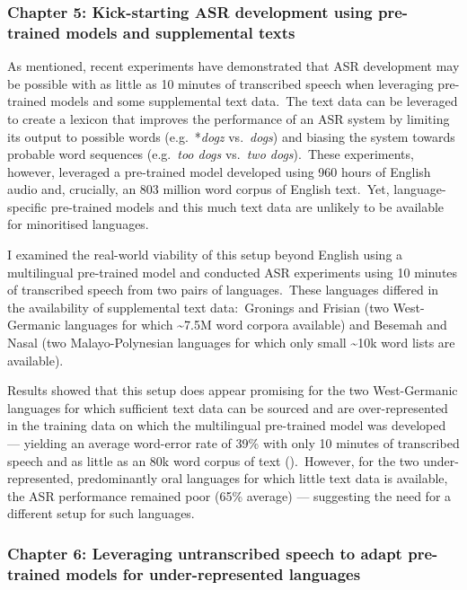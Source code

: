 \documentclass[main.tex]{subfiles}
\begin{document}
\subsubsection{Chapter 5: Kick-starting ASR development using pre-trained models and supplemental texts}

As mentioned, recent experiments have demonstrated that ASR development may be possible with as little as 10 minutes of transcribed speech when leveraging pre-trained models and some supplemental text data.~The text data can be leveraged to create a lexicon that improves the performance of an ASR system by limiting its output to possible words (e.g.~*\textit{dogz} vs.~\textit{dogs}) and biasing the system towards probable word sequences (e.g.~\textit{too dogs} vs.~\textit{two dogs}).~These experiments, however, leveraged a pre-trained model developed using 960 hours of English audio and, crucially, an 803 million word corpus of English text.~Yet, language-specific pre-trained models and this much text data are unlikely to be available for minoritised languages.

I examined the real-world viability of this setup beyond English using a multilingual pre-trained model and conducted ASR experiments using 10 minutes of transcribed speech from two pairs of languages.~These languages differed in the availability of supplemental text data:~Gronings and Frisian (two West-Germanic languages for which \textasciitilde{}7.5M word corpora available) and Besemah and Nasal (two Malayo-Polynesian languages for which only small \textasciitilde{}10k word lists are available).

Results showed that this setup does appear promising for the two West-Germanic languages for which sufficient text data can be sourced and are over-represented in the training data on which the multilingual pre-trained model was developed  --- yielding an average word-error rate of 39\% with only 10 minutes of transcribed speech and as little as an 80k word corpus of text ().~However, for the two under-represented, predominantly oral languages for which little text data is available, the ASR performance remained poor (65\% average) --- suggesting the need for a different setup for such languages.

\subsubsection{Chapter 6: Leveraging untranscribed speech to adapt pre-trained models for under-represented languages}
\end{document}
